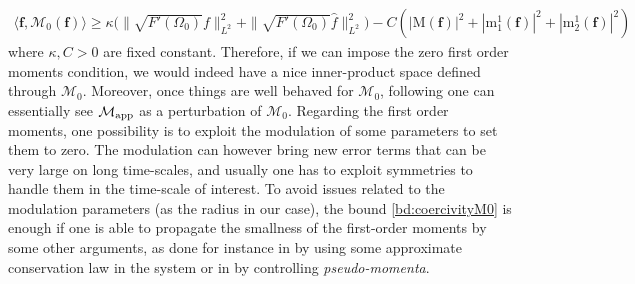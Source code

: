 \documentclass[11pt,reqno,a4paper]{amsart}
\newcommand{\cM}{\mathcal{M}}
\newcommand{\mrm}{\mathrm{m}}
\newcommand{\mrM}{\mathrm{M}}
\newcommand{\1}{\mathbbm{1}}
\theoremstyle{definition}
\theoremstyle{definition}
\numberwithin{equation}{section}
\begin{document}
\begin{align}
\label{bd:coercivityM0}
    \langle {\mathbf f}, \cM_0 ({\mathbf f})\rangle \geq \kappa(\|\sqrt{F'(\Omega_0)}f\|^2_{L^2}+\|\sqrt{F'(\Omega_0)}\widehat{f}\|^2_{L^2}\big)-C(|\mrM({\mathbf f})|^2+|\mrm_1^1({\mathbf f})|^2+|\mrm_2^1({\mathbf f})|^2)
\end{align}
where $\kappa,C>0$ are fixed constant.  Therefore, if we can impose the zero first order moments condition, we would indeed have a nice inner-product space defined through $\cM_{0}$. Moreover,  once things are well behaved for $\cM_{0}$, following \cite{GaSring,dolce2024long} one can essentially see $\cM_{\rm app}$ as a perturbation of $\cM_{0}$. Regarding the first order moments, one possibility is to exploit the modulation of some parameters to set them to zero. The modulation can however bring new error terms that can be very large on long time-scales, and usually one has to exploit symmetries to handle them \cite{dolce2024long} in the time-scale of interest. To  avoid issues related to the modulation parameters (as the radius in our case), the bound \cref{bd:coercivityM0} is enough if one is able to  propagate the smallness of the first-order moments by some other arguments,  as done for instance in \cite{GaSring} by using some approximate conservation law in the system or in \cite{zhang2025long} by controlling \emph{pseudo-momenta}. 
\end{document}
